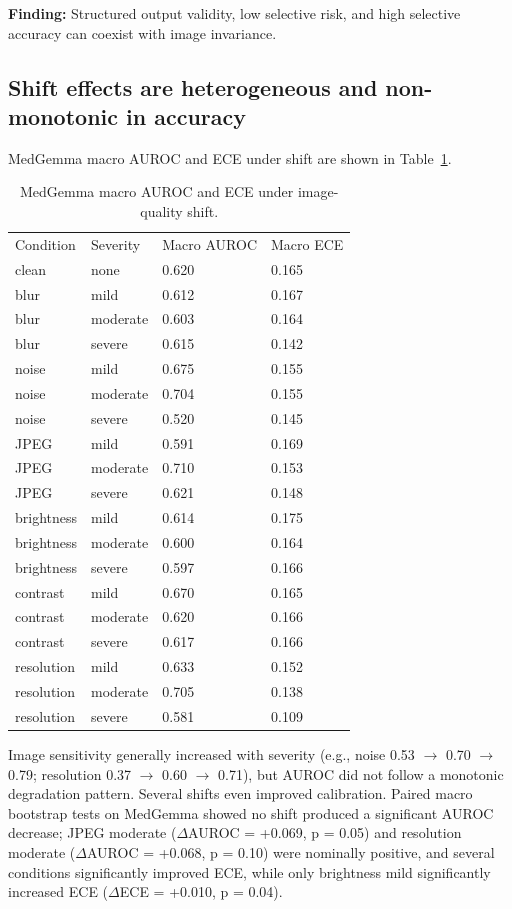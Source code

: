 \textbf{Finding:} Structured output validity, low selective risk, and high selective
accuracy can coexist with image invariance.

\subsection{Shift effects are heterogeneous and non-monotonic in accuracy}

MedGemma macro AUROC and ECE under shift are shown in Table~\ref{tab:shift}.

\begin{table}[t]
\centering
\small
\begin{tabular}{llll}
\hline
Condition & Severity & Macro AUROC & Macro ECE \\
clean & none & 0.620 & 0.165 \\
blur & mild & 0.612 & 0.167 \\
blur & moderate & 0.603 & 0.164 \\
blur & severe & 0.615 & 0.142 \\
noise & mild & 0.675 & 0.155 \\
noise & moderate & 0.704 & 0.155 \\
noise & severe & 0.520 & 0.145 \\
JPEG & mild & 0.591 & 0.169 \\
JPEG & moderate & 0.710 & 0.153 \\
JPEG & severe & 0.621 & 0.148 \\
brightness & mild & 0.614 & 0.175 \\
brightness & moderate & 0.600 & 0.164 \\
brightness & severe & 0.597 & 0.166 \\
contrast & mild & 0.670 & 0.165 \\
contrast & moderate & 0.620 & 0.166 \\
contrast & severe & 0.617 & 0.166 \\
resolution & mild & 0.633 & 0.152 \\
resolution & moderate & 0.705 & 0.138 \\
resolution & severe & 0.581 & 0.109 \\
\hline
\end{tabular}
\caption{MedGemma macro AUROC and ECE under image-quality shift.}
\label{tab:shift}
\end{table}

Image sensitivity generally increased with severity (e.g., noise 0.53 $\rightarrow$ 0.70 $\rightarrow$ 0.79; resolution 0.37 $\rightarrow$ 0.60 $\rightarrow$ 0.71), but AUROC did not follow a monotonic degradation pattern. Several shifts even improved calibration. Paired macro bootstrap tests on MedGemma showed no shift produced a significant AUROC decrease; JPEG moderate ($\Delta$AUROC = +0.069, p = 0.05) and resolution moderate ($\Delta$AUROC = +0.068, p = 0.10) were nominally positive, and several conditions significantly improved ECE, while only brightness mild significantly increased ECE ($\Delta$ECE = +0.010, p = 0.04).

